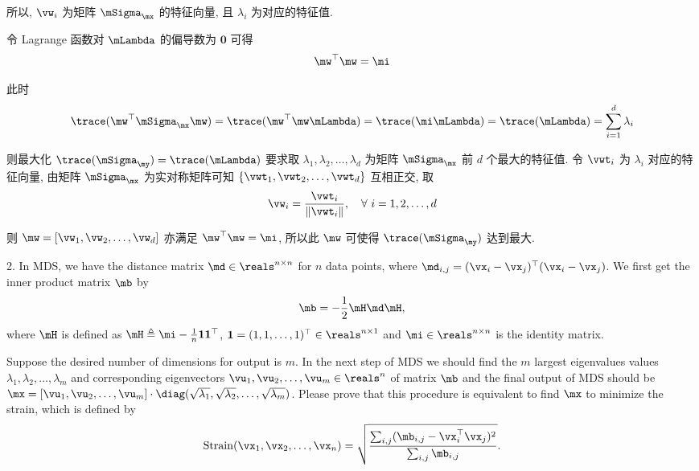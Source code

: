 \documentclass[openany]{ctexbook}
\theoremstyle{kaiti}
\theoremstyle{normal}
\begin{document}
所以, $\vw_i$ 为矩阵 $\mSigma_{\mx}$ 的特征向量, 且 $\lambda_i$ 为对应的特征值.

令 Lagrange 函数对 $\mLambda$ 的偏导数为 $\bm{0}$ 可得
\begin{equation}
  \mw^\top\mw=\mi
\end{equation}

此时
\begin{equation}
  \trace(\mw^\top\mSigma_{\mx}\mw)
  =\trace(\mw^\top\mw\mLambda)
  =\trace(\mi\mLambda)
  =\trace(\mLambda)=\sum_{i=1}^d\lambda_i
\end{equation}

则最大化 $\trace(\mSigma_{\my})=\trace(\mLambda)$ 要求取 $\lambda_1,\lambda_2,\dots,\lambda_d$ 为矩阵 $\mSigma_{\mx}$ 前 $d$ 个最大的特征值. 令 $\vwt_i$ 为 $\lambda_i$ 对应的特征向量, 由矩阵 $\mSigma_{\mx}$ 为实对称矩阵可知 $\{\vwt_1,\vwt_2,\dots,\vwt_d\}$ 互相正交, 取
\begin{equation}
  \vw_i=\frac{\vwt_i}{\|\vwt_i\|},\quad\forall~i=1,2,\dots,d
\end{equation}

则 $\mw=[\vw_1,\vw_2,\dots,\vw_d]$ 亦满足 $\mw^\top\mw=\mi$, 所以此 $\mw$ 可使得 $\trace(\mSigma_{\my})$ 达到最大.

2. In MDS, we have the distance matrix $\md\in\reals^{n\times n}$ for $n$ data points, where $\md_{i,j}=(\vx_i-\vx_j)^\top(\vx_i-\vx_j)$. We first get the inner product matrix $\mb$ by
\begin{equation}
  \mb=-\frac{1}{2}\mH\md\mH,
\end{equation}
where $\mH$ is defined as $\mH\triangleq\mi-\frac{1}{n}\bm{1}\bm{1}^\top$, $\bm{1}=(1,1,\dots,1)^\top\in\reals^{n\times 1}$ and $\mi\in\reals^{n\times n}$ is the identity matrix.

Suppose the desired number of dimensions for output is $m$. In the next step of MDS we should find the $m$ largest eigenvalues values $\lambda_1, \lambda_2, \dots, \lambda_m$ and corresponding eigenvectors $\vu_1, \vu_2, \dots, \vu_m\in\reals^n$ of matrix $\mb$ and the final output of MDS should be $\mx=[\vu_1, \vu_2, \dots, \vu_m]\cdot\diag(\sqrt{\lambda_1}, \sqrt{\lambda_2}, \dots, \sqrt{\lambda_m})$. Please prove that this procedure is equivalent to find $\mx$ to minimize the strain, which is defined by
\begin{equation}
  \mathrm{Strain}(\vx_1,\vx_2,\dots,\vx_n)=\sqrt{\frac{\sum_{i,j}(\mb_{i,j} - \vx_i^\top\vx_j)^2}{\sum_{i,j}\mb_{i,j}}}.
\end{equation}
\end{document}
